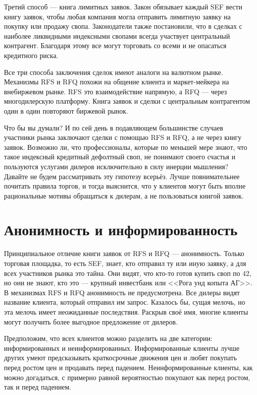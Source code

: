 Третий способ --- книга лимитных заявок. Закон обязывает каждый SEF вести книгу
заявок, чтобы любая компания могла отправить лимитную заявку на покупку или
продажу свопа. Законодатели также постановили, что в сделках с наиболее
ликвидными индексными свопами всегда участвует центральный контрагент. Благодаря
этому все могут торговать со всеми и не опасаться кредитного риска.

Все три способа заключения сделок имеют аналоги на валютном рынке. Механизмы RFS
и RFQ похожи на общение клиента и маркет-мейкера на внебиржевом рынке. RFS это
взаимодействие напрямую, а RFQ --- через многодилерскую платформу. Книга заявок
и сделки с центральным контрагентом один в один повторяют биржевой рынок.

Что бы вы думали? И по сей день в подавляющем большинстве случаев участники
рынка заключают сделки с помощью RFS и RFQ, а не через книгу
заявок. Возможно ли, что профессионалы, которые по меньшей мере знают, что такое
индексный кредитный дефолтный своп, не понимают своего счастья и пользуются услугами
дилеров исключительно в силу инерции мышления? Давайте не будем рассматривать
эту гипотезу всерьёз. Лучше повнимательнее почитать правила торгов, и тогда
выяснится, что у клиентов могут быть вполне рациональные мотивы обращаться к
дилерам, а не пользоваться книгой заявок.

\section*{Анонимность и информированность}

Принципиальное отличие книги заявок от RFS и RFQ --- анонимность. Только
торговая площадка, то есть SEF, знает, кто отправил ту или иную заявку, а для
всех участников рынка это тайна. Они видят, что кто-то готов купить своп по 42,
но они не знают, кто это --- крупный инвестбанк или <<Рога унд копыта АГ>>. В
механизмах RFS и RFQ анонимность не предусмотрена. Все дилеры видят название
клиента, который отправил им запрос. Казалось бы, сущая мелочь, но эта мелочь
имеет неожиданные последствия. Раскрыв своё имя, многие клиенты могут получить
более выгодное предложение от дилеров.

Предположим, что всех клиентов можно разделить на две категории: информированных
и неинформированных. Информированные клиенты лучше других умеют предсказывать
краткосрочные движения цен и любят покупать перед ростом цен и продавать перед
падением. Неинформированные клиенты, как можно догадаться, с примерно равной
вероятностью покупают как перед ростом, так и перед падением.

